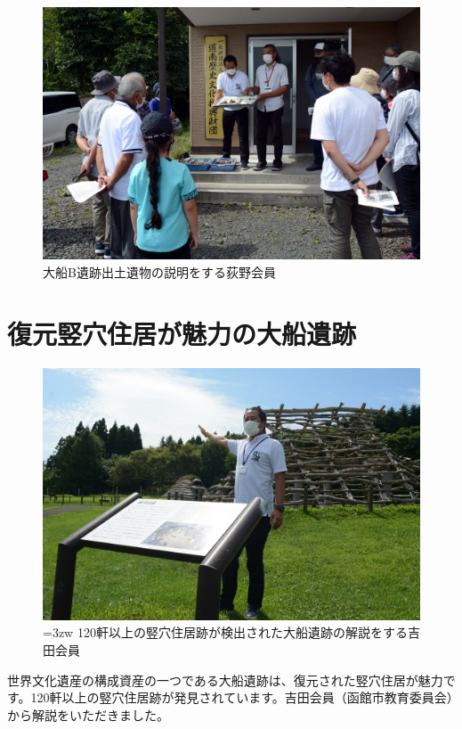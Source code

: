 \documentclass[a4j,11pt,twocolumn,openany]{jsbook}
\begin{document}
\begin{figure}[ht]
	\centering
	\includegraphics[width=\linewidth]{fig/01_Iseki_kengaku/01_Opening.JPG}
	\caption{大船B遺跡出土遺物の説明をする荻野会員}
	\label{}
\end{figure}

\section{復元竪穴住居が魅力の大船遺跡}

\begin{figure}[ht]
	\centering
	\includegraphics[width=\linewidth]{fig/01_Iseki_kengaku/02_Ofune.JPG}
	\caption{\hangindent=3zw
		120軒以上の竪穴住居跡が検出された大船遺跡の解説をする吉田会員}
	\label{}
\end{figure}

世界文化遺産の構成資産の一つである大船遺跡は、復元された竪穴住居が魅力です。120軒以上の竪穴住居跡が発見されています。吉田会員（函館市教育委員会）から解説をいただきました。
\end{document}
